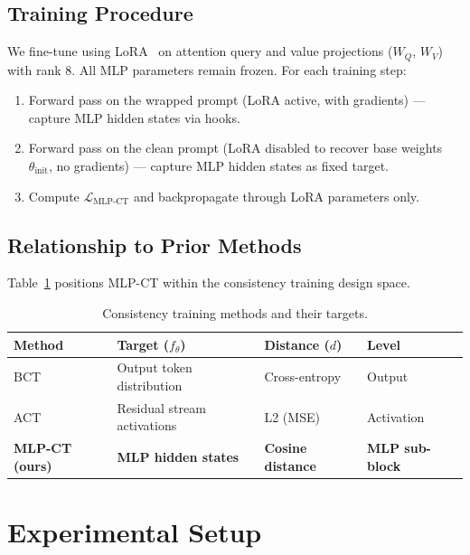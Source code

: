 \documentclass[12pt, letterpaper]{article}
\begin{document}
\subsection{Training Procedure}

We fine-tune using LoRA~\citep{hu2021lora} on attention query and value projections ($W_Q$, $W_V$) with rank 8. All MLP parameters remain frozen. For each training step:
\begin{enumerate}
    \item Forward pass on the wrapped prompt (LoRA active, with gradients) --- capture MLP hidden states via hooks.
    \item Forward pass on the clean prompt (LoRA disabled to recover base weights $\theta_{\text{init}}$, no gradients) --- capture MLP hidden states as fixed target.
    \item Compute $\mathcal{L}_{\text{MLP-CT}}$ and backpropagate through LoRA parameters only.
\end{enumerate}

\subsection{Relationship to Prior Methods}

Table~\ref{tab:methods} positions MLP-CT within the consistency training design space.

\begin{table}[h]
\centering
\small
\caption{Consistency training methods and their targets.}
\label{tab:methods}
\begin{tabular}{llll}
\toprule
\textbf{Method} & \textbf{Target ($f_\theta$)} & \textbf{Distance ($d$)} & \textbf{Level} \\
\midrule
BCT~\citep{chua2024bias} & Output token distribution & Cross-entropy & Output \\
ACT~\citep{irpan2025consistency} & Residual stream activations & L2 (MSE) & Activation \\
\textbf{MLP-CT (ours)} & \textbf{MLP hidden states} & \textbf{Cosine distance} & \textbf{MLP sub-block} \\
\bottomrule
\end{tabular}
\end{table}

\section{Experimental Setup}
\end{document}
